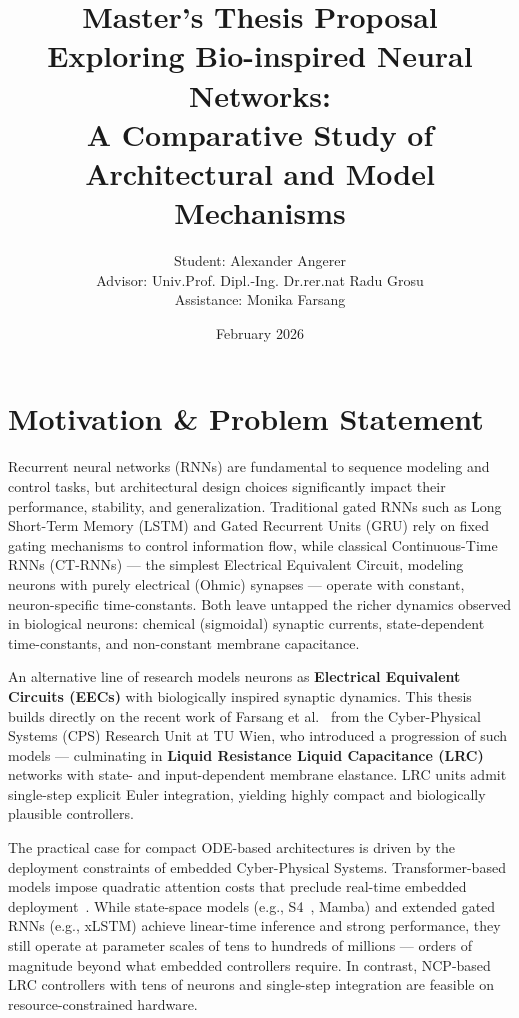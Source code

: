 \documentclass[11pt,a4paper]{article}
\begin{document}

\title{\textbf{Master's Thesis Proposal} \\
Exploring Bio-inspired Neural Networks: \\
A Comparative Study of Architectural and Model Mechanisms}

\author{Student: Alexander Angerer \\ Advisor: Univ.Prof. Dipl.-Ing. Dr.rer.nat Radu Grosu \\ Assistance: Monika Farsang}
\date{February 2026}
\maketitle


\section{Motivation \& Problem Statement}

Recurrent neural networks (RNNs) are fundamental to sequence modeling and control tasks, but architectural design choices significantly impact their performance, stability, and generalization. Traditional gated RNNs such as Long Short-Term Memory (LSTM) \cite{Hochreiter1997} and Gated Recurrent Units (GRU) \cite{Cho2014} rely on fixed gating mechanisms to control information flow, while classical Continuous-Time RNNs (CT-RNNs) --- the simplest Electrical Equivalent Circuit, modeling neurons with purely electrical (Ohmic) synapses --- operate with constant, neuron-specific time-constants. Both leave untapped the richer dynamics observed in biological neurons: chemical (sigmoidal) synaptic currents, state-dependent time-constants, and non-constant membrane capacitance.

An alternative line of research models neurons as \textbf{Electrical Equivalent Circuits (EECs)} with biologically inspired synaptic dynamics. This thesis builds directly on the recent work of Farsang et al.\ \cite{Farsang2024liquid, Farsang2024chemical} from the Cyber-Physical Systems (CPS) Research Unit at TU Wien, who introduced a progression of such models --- culminating in \textbf{Liquid Resistance Liquid Capacitance (LRC)} networks with state- and input-dependent membrane elastance. LRC units admit single-step explicit Euler integration, yielding highly compact and biologically plausible controllers.

The practical case for compact ODE-based architectures is driven by the deployment constraints of embedded Cyber-Physical Systems. Transformer-based models impose quadratic attention costs that preclude real-time embedded deployment~\cite{vaswani2017attention}. While state-space models (e.g., S4~\cite{gu2021efficiently}, Mamba) and extended gated RNNs (e.g., xLSTM) achieve linear-time inference and strong performance, they still operate at parameter scales of tens to hundreds of millions --- orders of magnitude beyond what embedded controllers require. In contrast, NCP-based LRC controllers with tens of neurons and single-step integration are feasible on resource-constrained hardware.
\end{document}
